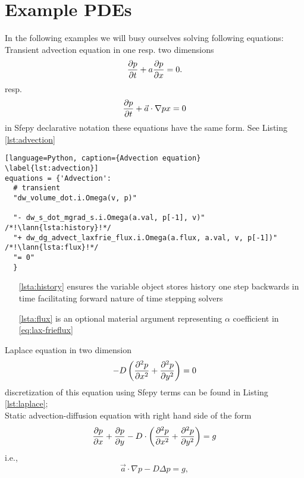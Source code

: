 \section{Example PDEs}
In the following examples we will busy ourselves solving following equations:\\
Transient advection equation in one resp. two dimensions
\begin{equation}
	\label{eq:ex_advection}
	\frac{\partial p}{\partial t} + a\frac{\partial p}{\partial x} = 0.
\end{equation}
resp.
\begin{equation}
	\frac{\partial p}{\partial t} + \vec{a}\cdot\nabla{p}{x} = 0
\end{equation}
in Sfepy declarative notation these equations have the same form. See Listing 
\ref{lst:advection}
\setcounter{lstannotation}{0}
\begin{lstlisting}[language=Python, caption={Advection equation}
\label{lst:advection}]
equations = {'Advection': 
  # transient
  "dw_volume_dot.i.Omega(v, p)"
 
  "- dw_s_dot_mgrad_s.i.Omega(a.val, p[-1], v)" /*!\lann{lsta:history}!*/
  "+ dw_dg_advect_laxfrie_flux.i.Omega(a.flux, a.val, v, p[-1])"  /*!\lann{lsta:flux}!*/
  "= 0"
  }
\end{lstlisting}
\begin{itemize}
	\item[\ref{lsta:history}]  ensures the variable object stores 
	history one step backwards in time facilitating forward nature of time stepping 
	solvers
	\item[\ref{lsta:flux}]  is an optional material argument 
	representing $\alpha$ coefficient in \eqref{eq:lax-frieflux}
\end{itemize}
Laplace equation in two dimension
\begin{equation}
	\label{eq:ex_laplace}
	- D \left(\frac{\partial^2 p}{\partial x^2} + \frac{\partial^2 p}{\partial y^2} \right)= 0
\end{equation}
discretization of this equation using Sfepy terms can be found in Listing 
\ref{lst:laplace};\\
Static advection-diffusion equation with right hand side of the form
\begin{equation}
\label{eq:ex_advdiff}
\frac{\partial p}{\partial x} + \frac{\partial p}{\partial y} - D \cdot \left( \frac{\partial^2 p}{\partial x^2} + \frac{\partial^2 
p}{\partial y^2} \right) = g
\end{equation}
i.e.,
\begin{equation}
\vec{a} \cdot \nabla p - D \Delta p = g,
\end{equation}

